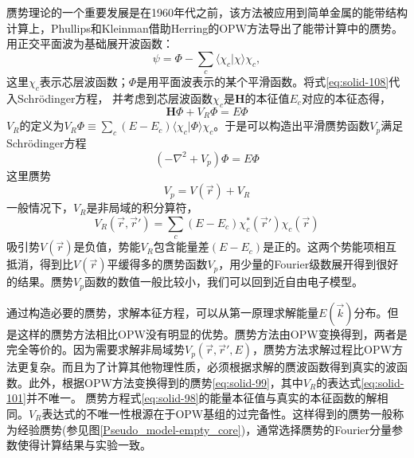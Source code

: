 赝势理论的一个重要发展是在1960年代之前，该方法被应用到简单金属的能带结构计算上，Phullips和Kleinman借助Herring的OPW方法导出了能带计算中的赝势\cite{pr116-287_1959}。用正交平面波为基础展开波函数：
\begin{equation}
  \psi=\Phi-\sum_c\langle\chi_c|\chi\rangle\chi_c,
  \label{eq:solid-108}
\end{equation}
这里$\chi_c$表示芯层波函数；$\Phi$是用平面波表示的某个平滑函数。将式\eqref{eq:solid-108}代入Schr\"odinger方程，%
并考虑到芯层波函数$\chi_c$是$\mathbf H$的本征值$E_c$对应的本征态得，%
\begin{equation}
  \mathbf H\Phi+V_R\Phi=E\Phi
  \label{eq:solid-97}
\end{equation}
$V_R$的定义为$V_R\Phi\equiv\sum\limits_c(E-E_c)\langle\chi_c|\Phi\rangle\chi_c$。于是可以构造出平滑赝势函数$V_p$满足Schr\"odinger方程
\begin{equation}
  (-\nabla^2+V_p)\Phi=E\Phi
  \label{eq:solid-98}
\end{equation}
这里赝势
\begin{equation}
  V_p=V(\vec r)+V_R
  \label{eq:solid-99}
\end{equation}
一般情况下，$V_R$是非局域的积分算符，%
\begin{equation}
  V_R(\vec r,\vec r')=\sum_c(E-E_c)\chi_c^{\ast}(\vec r')\chi_c(\vec r)
 \label{eq:solid-101}
\end{equation}
吸引势$V(\vec r)$是负值，势能$V_R$包含能量差$(E-E_c)$是正的。这两个势能项相互抵消，得到比$V(\vec r)$平缓得多的赝势函数$V_p$，用少量的Fourier级数展开得到很好的结果。赝势$V_p$函数的数值一般比较小，我们可以回到近自由电子模型。

通过构造必要的赝势，求解本征方程，可以从第一原理求解能量$E(\vec k)$分布。但是这样的赝势方法相比OPW没有明显的优势。赝势方法由OPW变换得到，两者是完全等价的。因为需要求解非局域势$V_p(\vec r,\vec r',E)$，赝势方法求解过程比OPW方法更复杂。而且为了计算其他物理性质，必须根据求解的赝波函数得到真实的波函数。此外，根据OPW方法变换得到的赝势\eqref{eq:solid-99}，其中$V_R$的表达式\eqref{eq:solid-101}并不唯一。%
赝势方程式\eqref{eq:solid-98}的能量本征值与真实的本征函数的解相同\cite{Harrison}。$V_R$表达式的不唯一性根源在于OPW基组的过完备性。这样得到的赝势一般称为经验赝势(参见图\ref{Pseudo_model-empty_core})，通常选择赝势的Fourier分量参数使得计算结果与实验一致。

